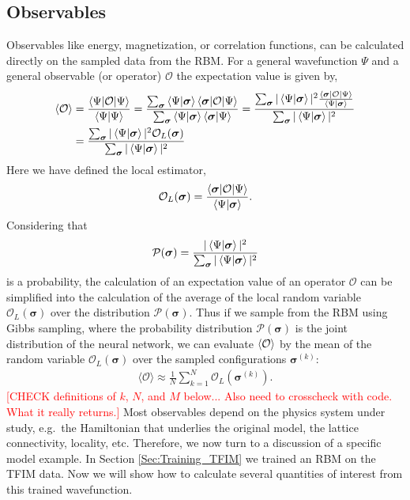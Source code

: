 \documentclass[submission, Phys]{SciPost}
\begin{document}
\subsection{Observables}
\label{Sec:Observables}

Observables like energy, magnetization, or correlation functions, can be calculated directly on the sampled data from the RBM. 
For a general wavefunction $\Psi$ and a general observable (or operator) $\mathcal{O}$ the expectation value is given by,
\begin{align}
\braket{\mathcal{O}} &= \frac{\braket{\Psi | \mathcal{O} | \Psi}}{\braket{\Psi | \Psi}} = \frac{\sum_{\bm{\sigma}} \braket{\Psi | {\bm{\sigma}}} \braket{{\bm{\sigma}} | \mathcal{O} | \Psi}}{\sum_{\bm{\sigma}} \braket{\Psi | {\bm{\sigma}}} \braket{{\bm{\sigma}} | \Psi}} = \frac{\sum_{\bm{\sigma}} | \braket{\Psi | {\bm{\sigma}}} |^2 \frac{\braket{{\bm{\sigma}} | \mathcal{O} | \Psi}}{\braket{\Psi | {\bm{\sigma}}}} }{\sum_{\bm{\sigma}}  | \braket{\Psi | {\bm{\sigma}}} |^2} \\
&= \frac{\sum_{\bm{\sigma}} | \braket{\Psi | {\bm{\sigma}}} |^2 \mathcal{O}_L({\bm{\sigma}}) }{\sum_{\bm{\sigma}}  | \braket{\Psi | {\bm{\sigma}}} |^2} 
\end{align}
Here we have defined the local estimator,
\begin{equation}
\mathcal{O}_L({\bm{\sigma}}) =  \frac{\braket{{\bm{\sigma}} | \mathcal{O} | \Psi}}{\braket{\Psi | {\bm{\sigma}}}} .
\end{equation}
Considering that
\begin{equation}
\mathcal{P}({\bm{\sigma}}) = \frac{ | \braket{\Psi | {\bm{\sigma}}} |^2  }{\sum_{\bm{\sigma}}  | \braket{\Psi | {\bm{\sigma}}} |^2} 
\end{equation}
is a probability, the calculation of an expectation value of an operator $\mathcal{O}$ can be simplified into the calculation of  the average of the local random variable $\mathcal{O}_L({\bm{\sigma}})$ over the distribution $\mathcal{P}({\bm{\sigma}})$.
Thus if we sample from the RBM using Gibbs sampling,
where the probability distribution $\mathcal{P}({\bm{\sigma}})$ is the joint distribution of the neural network,
we can evaluate $\braket{\mathcal{O}}$ by the mean of the random variable $\mathcal{O}_L({\bm{\sigma}})$ over the 
sampled configurations ${\bm{\sigma}^{(k)}}$:
\begin{align}
\label{Eq:}
\mathcal{\langle O \rangle} \approx \frac{1}{N} \sum_{k=1}^N \mathcal{O}_L({\bm{\sigma}}^{(k)}).
\end{align}
\textcolor{red}{[CHECK definitions of $k$, $N$, and $M$ below... Also need to crosscheck with code. What it really returns.]}
Most observables depend on the physics system under study, e.g.~the Hamiltonian that underlies the original model, the lattice connectivity, locality, etc.  Therefore, we now turn to a discussion of a specific model example. In Section \ref{Sec:Training_TFIM} we trained an RBM on the TFIM data. Now we will show how to calculate several quantities of interest from this trained wavefunction.
\end{document}
